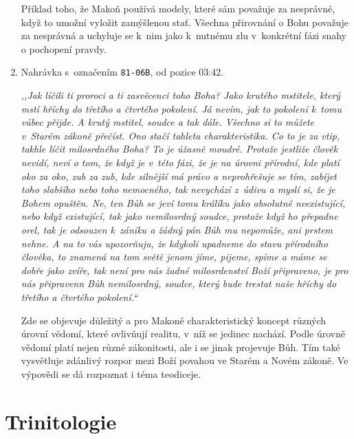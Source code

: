 \begin{enumerate}
{Příklad toho, že Makoň používá modely, které sám považuje za nesprávné, když to
umožní vyložit zamýšlenou stať. Všechna přirovnání o Bohu považuje za nesprávná
a uchyluje se k~nim jako k~nutnému zlu v~konkrétní fázi snahy o pochopení
pravdy.

}

\item{%
Nahrávka s~označením \texttt{81-06B}, od pozice 03:42.

\textit{%
,,Jak líčili ti proroci a ti zasvěcenci toho Boha? Jako krutého mstitele, který
mstí hříchy do třetího a čtvrtého pokolení. Já nevím, jak to pokolení k~tomu
vůbec přijde. A krutý mstitel,
soudce a tak dále. Všechno si to můžete v~Starém zákoně přečíst. Ono stačí tahleta
charakteristika. Co to je za vtip, takhle líčit milosrdného Boha? To je úžasně
moudré.
Protože jestliže člověk nevidí, neví o tom, že když je v~této fázi, že je na úrovni
přírodní, kde platí oko za oko, zub za zub, kde silnější má právo a neprohřešuje
se tím, zabíjet toho slabšího nebo toho nemocného, tak nevychází z~údivu a
myslí si,
že je Bohem opuštěn. Ne, ten Bůh se jeví tomu králíku jako absolutně
neexistující,
nebo když existující, tak jako nemilosrdný soudce, protože když ho přepadne orel,
tak je odsouzen k~zániku a žádný pán Bůh mu nepomůže, ani prstem nehne. A na to
vás upozorňuju, že kdykoli upadneme do stavu přírodního člověka, to znamená na
tom světě jenom jíme, pijeme, spíme a máme se dobře jako zvíře, tak není pro nás
žadné milosrdenství Boží připraveno, je pro nás připravenn Bůh nemilosrdný,
soudce, který bude trestat naše hříchy do třetího a čtvrtého pokolení.``
}

Zde se objevuje důležitý a pro Makoně charakteristický koncept různých úrovní
vědomí, které ovlivňují realitu, v~níž se jedinec nachází. Podle úrovně vědomí
platí nejen různé zákonitosti, ale i se jinak projevuje Bůh. Tím také vysvětluje
zdánlivý rozpor mezi Boží povahou ve Starém a Novém zákoně. Ve výpovědi se dá
rozpoznat i téma teodiceje.

}

\end{enumerate}

\section{Trinitologie}

